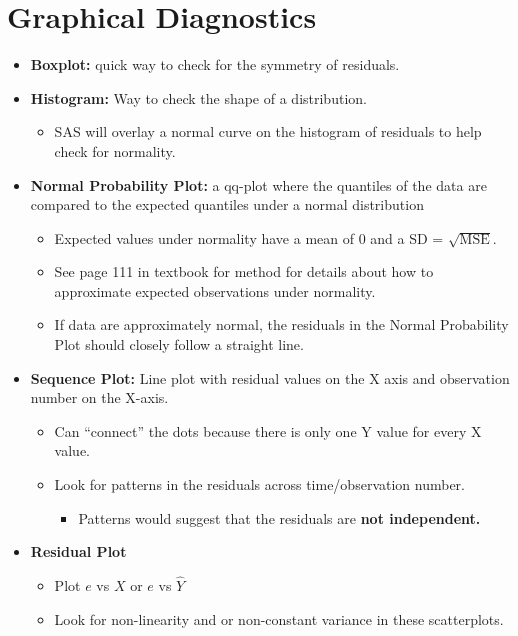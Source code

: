\documentclass[12pt]{../notes}
\begin{document}
\section{Graphical Diagnostics}
\begin{itemize}
\item \textbf{Boxplot:} quick way to check for the symmetry of residuals. 
\item \textbf{Histogram:} Way to check the shape of a distribution. 
\begin{itemize}
\item SAS will overlay a normal curve on the histogram of residuals to help check for normality. 
\end{itemize}
\item \textbf{Normal Probability Plot:} a qq-plot where the quantiles of the data are compared to the expected quantiles under a normal distribution
\begin{itemize}
\item Expected values under normality have a mean of $0$ and a SD = $\sqrt{\text{MSE}}.$
\item See page 111 in textbook for method for details about how to approximate expected observations under normality.  
\item If data are approximately normal, the residuals in the Normal Probability Plot should closely follow a straight line. 
\end{itemize}
\item \textbf{Sequence Plot:} Line plot with residual values on the X axis and observation number on the X-axis. 
\begin{itemize}
\item Can ``connect'' the dots because there is only one Y value for every X value. 
\item Look for patterns in the residuals across time/observation number. 
\begin{itemize}
\item Patterns would suggest that the residuals are \textbf{not independent.}
\end{itemize}
\end{itemize}
\item \textbf{Residual Plot}
\begin{itemize}
\item Plot $e$ vs $X$ or $e$ vs $\hat{Y}$
\item Look for non-linearity and or non-constant variance in these scatterplots.  
\end{itemize}
\end{itemize}
\end{document}
